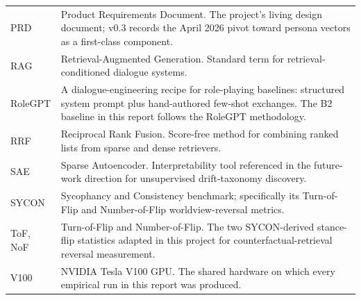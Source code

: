 \begin{tabularx}{\textwidth}{l X}
  PRD & Product Requirements Document. The project's living design document; v0.3 records the April 2026 pivot toward persona vectors as a first-class component. \\
  RAG & Retrieval-Augmented Generation. Standard term for retrieval-conditioned dialogue systems. \\
  RoleGPT & A dialogue-engineering recipe for role-playing baselines: structured system prompt plus hand-authored few-shot exchanges. The B2 baseline in this report follows the RoleGPT methodology. \\
  RRF & Reciprocal Rank Fusion. Score-free method for combining ranked lists from sparse and dense retrievers. \\
  SAE & Sparse Autoencoder. Interpretability tool referenced in the future-work direction for unsupervised drift-taxonomy discovery. \\
  SYCON & Sycophancy and Consistency benchmark; specifically its Turn-of-Flip and Number-of-Flip worldview-reversal metrics. \\
  ToF, NoF & Turn-of-Flip and Number-of-Flip. The two SYCON-derived stance-flip statistics adapted in this project for counterfactual-retrieval reversal measurement. \\
  V100 & NVIDIA Tesla V100 GPU. The shared hardware on which every empirical run in this report was produced. \\
  \bottomrule
\end{tabularx}
